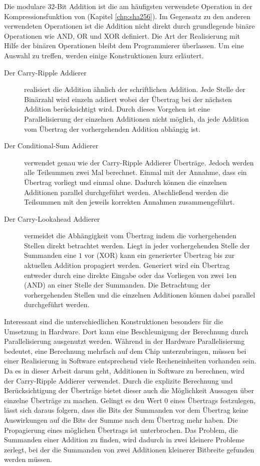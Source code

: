 Die modulare 32-Bit Addition ist die am häufigsten verwendete Operation in der Kompressionsfunktion von  (Kapitel \ref{chp:sha256}).
Im Gegensatz zu den anderen verwendeten Operationen ist die Addition nicht direkt durch grundlegende binäre Operationen wie AND, OR und XOR definiert.
Die Art der Realisierung mit Hilfe der binären Operationen bleibt dem Programmierer überlassen. Um eine Auswahl zu treffen, werden einige Konstruktionen kurz erläutert.
\begin{description}
  \item[Der Carry-Ripple Addierer] realisiert die Addition ähnlich der schriftlichen Addition. Jede Stelle der Binärzahl wird einzeln addiert wobei der Übertrag bei der
                                   nächsten Addition berücksichtigt wird. Durch dieses Vorgehen ist eine Parallelisierung der einzelnen Additionen nicht möglich, da jede
                                   Addition vom Übertrag der vorhergehenden Addition abhängig ist.
  \item[Der Conditional-Sum Addierer] verwendet genau wie der Carry-Ripple Addierer Überträge. Jedoch werden alle Teilsummen zwei Mal berechnet. Einmal mit der Annahme,
                                      dass ein Übertrag vorliegt und einmal ohne. Dadurch können die einzelnen Additionen parallel durchgeführt werden. Abschließend
                                      werden die Teilsummen mit den jeweils korrekten Annahmen zusammengeführt.
  \item[Der Carry-Lookahead Addierer] vermeidet die Abhängigkeit vom Übertrag indem die vorhergehenden Stellen direkt betrachtet werden. Liegt in jeder vorhergehenden
                                      Stelle der Summanden eine $1$ vor (XOR) kann ein generierter Übertrag bis zur aktuellen Addition propagiert werden. Generiert wird
                                      ein Übertrag entweder durch eine direkte Eingabe oder das Vorliegen von zwei $1$en (AND) an einer Stelle der Summanden. Die Betrachtung
                                      der vorhergehenden Stellen und die einzelnen Additionen können dabei parallel durchgeführt werden.
\end{description}
Interessant sind die unterschiedlichen Konstruktionen besonders für die Umsetzung in Hardware. Dort kann eine Beschleunigung der Berechnung durch Parallelisierung
ausgenutzt werden. Während in der Hardware Parallelisierung bedeutet, eine Berechnung mehrfach auf dem Chip unterzubringen, müssen bei einer Realisierung in Software
entsprechend viele Recheneinheiten vorhanden sein. Da es in dieser Arbeit darum geht, Additionen in Software zu berechnen, wird der Carry-Ripple Addierer verwendet.
Durch die explizite Berechnung und Berücksichtigung der Überträge bietet dieser auch die Möglichkeit Aussagen über einzelne Überträge zu machen. Gelingt es den Wert $0$
eines Übertrags festzulegen, lässt sich daraus folgern, dass die Bits der Summanden vor dem Übertrag keine Auswirkungen auf die Bits der Summe nach dem Übertrag mehr haben.
Die Propagierung eines möglichen Übertrags ist unterbrochen. Das Problem, die Summanden einer Addition zu finden, wird dadurch in zwei kleinere Probleme zerlegt, bei der
die Summanden von zwei Additionen kleinerer Bitbreite gefunden werden müssen.

